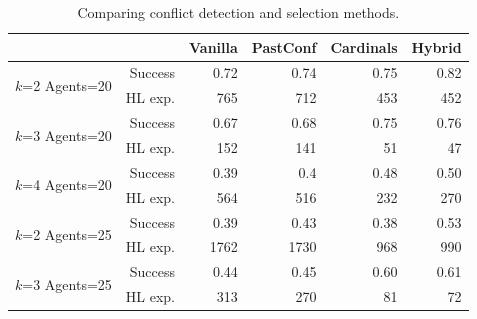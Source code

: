 \documentclass[review]{elsarticle}
\begin{document}
\begin{table}
\centering
\resizebox{0.9\columnwidth}{!}
{
\begin{tabular}{@{}lrrrrr@{}}
\toprule
  & &\multicolumn{1}{c}{Vanilla} & \multicolumn{1}{c}{PastConf} & \multicolumn{1}{c}{Cardinals} & \multicolumn{1}{c}{Hybrid} \\ \midrule

\multirow{2}{*}{
\parbox{1.5cm}{$k$=2 Agents=20}} & Success     & 0.72   & 0.74 & 0.75 & 0.82         \\
& HL exp. & 765    & 712 & 453 & 452                    \\ \midrule
\multirow{2}{*}{\parbox{1.5cm}{$k$=3 Agents=20}} & Success     & 0.67   & 0.68    & 0.75      & 0.76   \\
& HL exp.  & 152    & 141     & 51        & 47     \\ \midrule
\multirow{2}{*}{\parbox{1.5cm}{$k$=4 Agents=20}} & Success     & 0.39   & 0.4    & 0.48      & 0.50   \\
& HL exp.  & 564    & 516     & 232       & 270     \\ \midrule
\multirow{2}{*}{\parbox{1.5cm}{$k$=2 Agents=25}} & Success  & 0.39   & 0.43    & 0.38      & 0.53   \\
& HL exp. & 1762   & 1730    & 968       & 990  \\ \midrule
\multirow{2}{*}{\parbox{1.5cm}{$k$=3 Agents=25}} & Success  & 0.44   & 0.45    & 0.60      & 0.61   \\
& HL exp. & 313   & 270   & 81       & 72  \\ \bottomrule

\end{tabular}
}
\caption{Comparing conflict detection and selection methods.}
\label{tab:heuristics}
\end{table}
\end{document}
